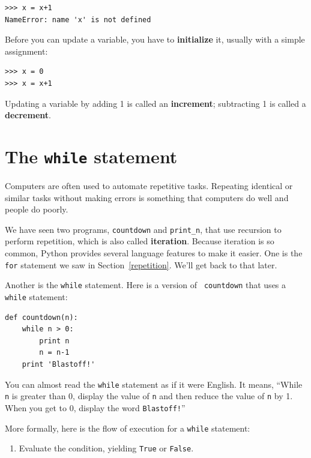 \documentclass[10pt]{book}
\begin{document}
\begin{CJK}{UTF8}{gbsn}
\begin{verbatim}
>>> x = x+1
NameError: name 'x' is not defined
\end{verbatim}
%
Before you can update a variable, you have to {\bf initialize}
it, usually with a simple assignment:

\begin{verbatim}
>>> x = 0
>>> x = x+1
\end{verbatim}
%
Updating a variable by adding 1 is called an {\bf increment};
subtracting 1 is called a {\bf decrement}.




\section{The {\tt while} statement}

Computers are often used to automate repetitive tasks.  Repeating
identical or similar tasks without making errors is something that
computers do well and people do poorly.

We have seen two programs, {\tt countdown} and \verb"print_n", that
use recursion to perform repetition, which is also called {\bf
iteration}.  Because iteration is so common, Python provides several
language features to make it easier.  One is the {\tt for} statement
we saw in Section~\ref{repetition}.  We'll get back to that later.

Another is the {\tt while} statement.  Here is a version of {\tt
countdown} that uses a {\tt while} statement:

\begin{verbatim}
def countdown(n):
    while n > 0:
        print n
        n = n-1
    print 'Blastoff!'
\end{verbatim}
%
You can almost read the {\tt while} statement as if it were English.
It means, ``While {\tt n} is greater than 0,
display the value of {\tt n} and then reduce the value of
{\tt n} by 1.  When you get to 0, display the word {\tt Blastoff!}''

More formally, here is the flow of execution for a {\tt while} statement:

\begin{enumerate}

\item Evaluate the condition, yielding {\tt True} or {\tt False}.


\end{enumerate}
\end{CJK}
\end{document}

